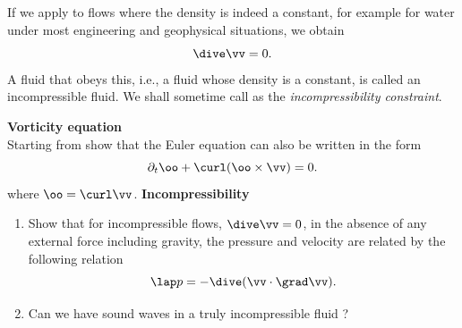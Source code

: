 If we apply  to flows where the density is indeed a
constant, for example for water under most engineering and geophysical
situations, we obtain
\begin{equation}
\dive \vv = 0 \/.
\label{A2.1:incom}
\end{equation}
A fluid that obeys this, i.e., a fluid whose density is a constant, is
called an incompressible fluid. We shall sometime call
 as the \textit{incompressibility constraint}.

\begin{Exercise}
\label{Ex3}
\Question
\label{prb3.1}
{\bf Vorticity equation}\\
Starting from  show that the Euler equation can also be
written in the form
\begin{equation}
\partial_t \oo + \curl (\oo\times\vv) = 0 \/.
\label{A2.1:vort}
\end{equation}
where $\oo=\curl\vv$. 
\Question
\label{prb3.2}
{\bf Incompressibility} 
\begin{enumerate}
\item  Show that for incompressible flows, $\dive \vv = 0$, in the absence of
any external force including gravity, the pressure and
velocity are related by the following relation
\begin{equation}
\lap p = - \dive(\vv\cdot\grad\vv)\/.
\end{equation} 
\item Can we have sound waves in a truly incompressible fluid ?
\end{enumerate}
\end{Exercise}
